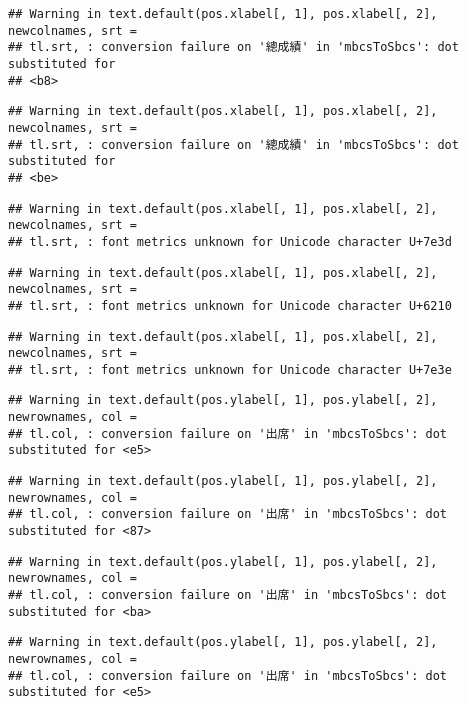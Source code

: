 \documentclass[
]{book}
\begin{document}
\begin{verbatim}
## Warning in text.default(pos.xlabel[, 1], pos.xlabel[, 2], newcolnames, srt =
## tl.srt, : conversion failure on '總成績' in 'mbcsToSbcs': dot substituted for
## <b8>
\end{verbatim}

\begin{verbatim}
## Warning in text.default(pos.xlabel[, 1], pos.xlabel[, 2], newcolnames, srt =
## tl.srt, : conversion failure on '總成績' in 'mbcsToSbcs': dot substituted for
## <be>
\end{verbatim}

\begin{verbatim}
## Warning in text.default(pos.xlabel[, 1], pos.xlabel[, 2], newcolnames, srt =
## tl.srt, : font metrics unknown for Unicode character U+7e3d
\end{verbatim}

\begin{verbatim}
## Warning in text.default(pos.xlabel[, 1], pos.xlabel[, 2], newcolnames, srt =
## tl.srt, : font metrics unknown for Unicode character U+6210
\end{verbatim}

\begin{verbatim}
## Warning in text.default(pos.xlabel[, 1], pos.xlabel[, 2], newcolnames, srt =
## tl.srt, : font metrics unknown for Unicode character U+7e3e
\end{verbatim}

\begin{verbatim}
## Warning in text.default(pos.ylabel[, 1], pos.ylabel[, 2], newrownames, col =
## tl.col, : conversion failure on '出席' in 'mbcsToSbcs': dot substituted for <e5>
\end{verbatim}

\begin{verbatim}
## Warning in text.default(pos.ylabel[, 1], pos.ylabel[, 2], newrownames, col =
## tl.col, : conversion failure on '出席' in 'mbcsToSbcs': dot substituted for <87>
\end{verbatim}

\begin{verbatim}
## Warning in text.default(pos.ylabel[, 1], pos.ylabel[, 2], newrownames, col =
## tl.col, : conversion failure on '出席' in 'mbcsToSbcs': dot substituted for <ba>
\end{verbatim}

\begin{verbatim}
## Warning in text.default(pos.ylabel[, 1], pos.ylabel[, 2], newrownames, col =
## tl.col, : conversion failure on '出席' in 'mbcsToSbcs': dot substituted for <e5>
\end{verbatim}
\end{document}
